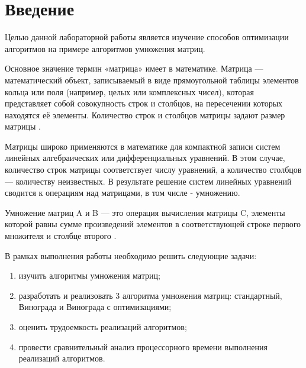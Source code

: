 \chapter*{Введение}

Целью данной лабораторной работы является изучение способов оптимизации алгоритмов на примере алгоритмов умножения матриц.

Основное значение термин «матрица» имеет в математике. Матрица — математический объект, записываемый в виде прямоугольной таблицы элементов кольца или поля (например, целых или комплексных чисел), которая представляет собой совокупность строк и столбцов, на пересечении которых находятся её элементы. Количество строк и столбцов матрицы задают размер матрицы \cite{matrix}.

Матрицы широко применяются в математике для компактной записи систем линейных алгебраических или дифференциальных уравнений. В этом случае, количество строк матрицы соответствует числу уравнений, а количество столбцов — количеству неизвестных. В результате решение систем линейных уравнений сводится к операциям над матрицами, в том числе - умножению.

Умножение матриц A и B — это операция вычисления матрицы C, элементы которой равны сумме произведений элементов в соответствующей строке первого множителя и столбце второго \cite{matrix2}.


В рамках выполнения работы необходимо решить следующие задачи: 
\begin{enumerate}[label={\arabic*)}]
	\item изучить алгоритмы умножения матриц;
	\item разработать и реализовать 3 алгоритма умножения матриц: стандартный, Винограда и Винограда с оптимизациями;
	\item оценить трудоемкость реализаций алгоритмов;
	\item провести сравнительный анализ процессорного времени выполнения реализаций алгоритмов.
\end{enumerate}
